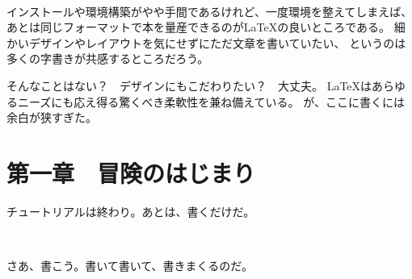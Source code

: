 \documentclass[
  book, tate,           %
  paper=a6,             %
  fontsize=13Q,         %
  jafontsize=13Q,       %
  line_length=39zw,     %
  number_of_lines=16,   %
  gutter=13mm,          %
  foot_space=10mm,      %
  baselineskip=1.6zw,   %
  headfoot_verticalposition=1zw, %
  hanging_punctuation   %
]{jlreq}
\begin{document}
\

インストールや環境構築がやや手間であるけれど、一度環境を整えてしまえば、
あとは同じフォーマットで本を量産できるのが\LaTeX{}の良いところである。
細かいデザインやレイアウトを気にせずにただ文章を書いていたい、
というのは多くの字書きが共感するところだろう。

そんなことはない？　デザインにもこだわりたい？　大丈夫。
\LaTeX{}はあらゆるニーズにも応え得る驚くべき柔軟性を兼ね備えている。
が、ここに書くには余白が狭すぎた。

\cleardoublepage %

\tableofcontents %

\cleardoublepage %

\chapter{第一章　冒険のはじまり}

チュートリアルは終わり。あとは、書くだけだ。

\

さあ、書こう。書いて書いて、書きまくるのだ。


\end{document}
